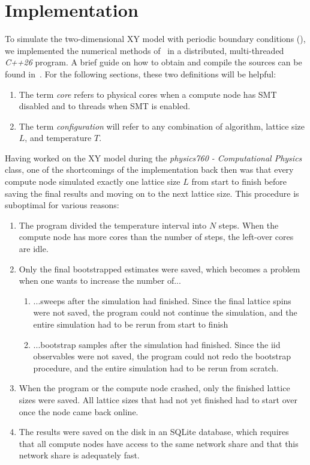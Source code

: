 \chapter{Implementation}\label{sec:impl}
	To simulate the two-dimensional XY model with periodic boundary conditions (), we implemented the numerical methods of~ in a distributed, multi-threaded \emph{C++26} program. A brief guide on how to obtain and compile the sources can be found in~. For the following sections, these two definitions will be helpful:
	\begin{enumerate}
		\item The term \emph{core} refers to physical cores when a compute node has SMT disabled and to threads when SMT is enabled.
		\item The term \emph{configuration} will refer to any combination of algorithm, lattice size $L$, and temperature $T$.
	\end{enumerate}
	
	Having worked on the XY model during the \emph{physics760 - Computational Physics} class, one of the shortcomings of the implementation back then was that every compute node simulated exactly one lattice size $L$ from start to finish before saving the final results and moving on to the next lattice size. This procedure is suboptimal for various reasons:
	\begin{enumerate}
		\item \label{shortcomings:cores} The program divided the temperature interval into $N$ steps. When the compute node has more cores than the number of steps, the left-over cores are idle.
		\item Only the final bootstrapped estimates were saved, which becomes a problem when one wants to increase the number of...
		\begin{enumerate}
			\item \label{shortcomings:sweeps}  ...sweeps after the simulation had finished. Since the final lattice spins were not saved, the program could not continue the simulation, and the entire simulation had to be rerun from start to finish
			\item \label{shortcomings:bootstrap} ...bootstrap samples after the simulation had finished. Since the iid observables were not saved, the program could not redo the bootstrap procedure, and the entire simulation had to be rerun from scratch.
		\end{enumerate}
		\item \label{shortcomings:crashed} When the program or the compute node crashed, only the finished lattice sizes were saved. All lattice sizes that had not yet finished had to start over once the node came back online.
		\item \label{shortcomings:sqlite} The results were saved on the disk in an SQLite database, which requires that all compute nodes have access to the same network share and that this network share is adequately fast.
	\end{enumerate}